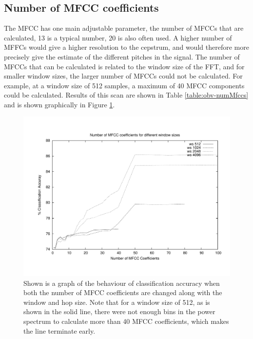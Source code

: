 \documentclass[12pt,oneside]{book}
\begin{document}
%
%
\subsection{Number of MFCC coefficients}

The MFCC has one main adjustable parameter, the number of MFCCs that
are calculated, 13 is a typical number, 20 is also often used.  A
higher number of MFFCs would give a higher resolution to the cepstrum,
and would therefore more precisely give the estimate of the different
pitches in the signal.  The number of MFCCs that can be calculated is
related to the window size of the FFT, and for smaller window sizes,
the larger number of MFCCs could not be calculated.  For example, at a
window size of 512 samples, a maximum of 40 MFCC components could be
calculated.  Results of this scan are shown in Table
\ref{table:obv-numMfccs} and is shown graphically in Figure
\ref{fig:gnuplot-obv-numMfcc}.

\begin{figure}[t]
\centering
\includegraphics[width=\columnwidth]{figures/gnuplot-obv-numMfcc}
\caption{Shown is a graph of the behaviour of classification accuracy
  when both the number of MFCC coefficients are changed along with the
  window and hop size.  Note that for a window size of 512, as
  is shown in the solid line, there were not enough bins in the power
  spectrum to calculate more than 40 MFCC coefficients, which makes
  the line terminate early.}
\label{fig:gnuplot-obv-numMfcc}
\end{figure}
\end{document}
